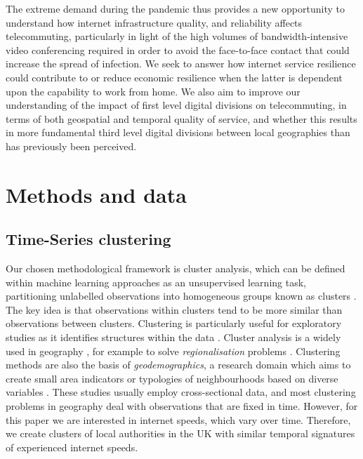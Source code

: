 \documentclass[]{interact}
\theoremstyle{plain}%
\theoremstyle{definition}
\theoremstyle{remark}
\begin{document}
The extreme demand during the pandemic thus provides a new opportunity
to understand how internet infrastructure quality, and reliability
affects telecommuting, particularly in light of the high volumes of
bandwidth-intensive video conferencing required in order to avoid the
face-to-face contact that could increase the spread of infection. We
seek to answer how internet service resilience could contribute to or
reduce economic resilience when the latter is dependent upon the
capability to work from home. We also aim to improve our understanding
of the impact of first level digital divisions on telecommuting, in
terms of both geospatial and temporal quality of service, and whether
this results in more fundamental third level digital divisions between
local geographies than has previously been perceived.

\hypertarget{sec:3}{%
\section{Methods and data}\label{sec:3}}

\hypertarget{sec:3.1}{%
\subsection{Time-Series clustering}\label{sec:3.1}}

Our chosen methodological framework is cluster analysis, which can be
defined within machine learning approaches as an unsupervised learning
task, partitioning unlabelled observations into homogeneous groups known
as clusters \citep{montero2014tsclust}. The key idea is that
observations within clusters tend to be more similar than observations
between clusters. Clustering is particularly useful for exploratory
studies as it identifies structures within the data
\citep{aghabozorgi2015time}. Cluster analysis is a widely used in
geography \citep{gordon1977classification, everitt1974cluster}, for
example to solve \emph{regionalisation} problems
\citep{niesterowicz2016}. Clustering methods are also the basis of
\emph{geodemographics}, a research domain which aims to create small
area indicators or typologies of neighbourhoods based on diverse
variables \citep{SINGLETON2009289, harris2005geodemographics}. These
studies usually employ cross-sectional data, and most clustering
problems in geography deal with observations that are fixed in time.
However, for this paper we are interested in internet speeds, which vary
over time. Therefore, we create clusters of local authorities in the UK
with similar temporal signatures of experienced internet speeds.
\end{document}
